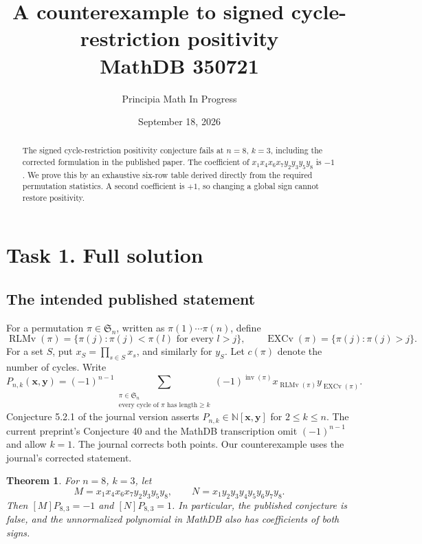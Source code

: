 \documentclass[11pt]{article}
\title{A counterexample to signed cycle-restriction positivity\\\large MathDB 350721}
\author{Principia Math In Progress}
\date{September 18, 2026}
\newtheorem{theorem}{Theorem}
\newcommand{\RLM}{\operatorname{RLMv}}
\newcommand{\EXC}{\operatorname{EXCv}}
\newcommand{\inv}{\operatorname{inv}}
\begin{document}
\maketitle
\begin{abstract}
The signed cycle-restriction positivity conjecture fails at $n=8$,
$k=3$, including the corrected formulation in the published paper.
The coefficient of $x_1x_4x_6x_7y_2y_3y_5y_8$ is $-1$.
We prove this by an exhaustive six-row table derived directly from
the required permutation statistics. A second coefficient is $+1$,
so changing a global sign cannot restore positivity.
\end{abstract}

\section*{Task 1. Full solution}
\subsection*{The intended published statement}
For a permutation $\pi\in\mathfrak S_n$, written as
$\pi(1)\cdots\pi(n)$, define
\[
 \RLM(\pi)=\{\pi(j):\pi(j)<\pi(l)\text{ for every }l>j\},
 \qquad
 \EXC(\pi)=\{\pi(j):\pi(j)>j\}.
\]
For a set $S$, put $x_S=\prod_{s\in S}x_s$, and similarly for $y_S$.
Let $c(\pi)$ denote the number of cycles. Write
\begin{equation}\label{eq:P}
 P_{n,k}(\mathbf x,\mathbf y)=(-1)^{n-1}
 \sum_{\substack{\pi\in\mathfrak S_n\\
                  \text{every cycle of }\pi\text{ has length}\ge k}}
 (-1)^{\inv(\pi)}x_{\RLM(\pi)}y_{\EXC(\pi)}.
\end{equation}
Conjecture 5.2.1 of the journal version \cite[p.~411]{final} asserts
$P_{n,k}\in\mathbb N[\mathbf x,\mathbf y]$ for $2\le k\le n$.
The current preprint's Conjecture 40 and the MathDB transcription omit
$(-1)^{n-1}$ and allow $k=1$. The journal corrects both points.
Our counterexample uses the journal's corrected statement.

\begin{theorem}\label{thm:counter}
For $n=8$, $k=3$, let
\[
 M=x_1x_4x_6x_7y_2y_3y_5y_8,\qquad
 N=x_1y_2y_3y_4y_5y_6y_7y_8.
\]
Then $[M]P_{8,3}=-1$ and $[N]P_{8,3}=1$.
In particular, the published conjecture is false, and the
unnormalized polynomial in MathDB also has coefficients of both signs.
\end{theorem}
\end{document}
